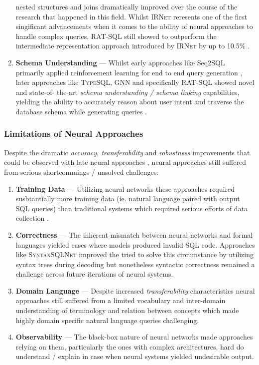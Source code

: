 \documentclass{article}
\begin{document}
\begin{enumerate}
          nested structures and joins dramatically improved over the course of the research that happened in this field. Whilst 
          \textsc{IRNet} reresents one of the first singificant advancements when it comes to the ability of neural approaches to handle
          complex queries, \textsc{RAT-SQL} still showed to outperform the intermediate representation approach introduced by \textsc{IRNet}
          by up to 10.5\% \citep{IRNet, RATSQL}.
    \item \textbf{Schema Understanding} — Whilst early approaches like Seq2SQL primarily applied reinforcement learning for end to end
          query generation \citep{Seq2SQL}, later approaches like \textsc{TypeSQL, GNN} and specifically \textsc{RAT-SQL} showed novel and state-of-
          the-art \textit{schema understanding / schema linking} capabilities, yielding the ability to accurately reason about user intent and
          traverse the database schema while generating queries \citep{TypeSQL, GNN, RATSQL}. 
\end{enumerate}

\subsubsection{Limitations of Neural Approaches}

Despite the dramatic \textit{accuracy, transferability} and \textit{robustness} improvements that could be observed with late neural
approaches \citep{IRNet, RATSQL}, neural approaches still suffered from serious shortcommings / unsolved challenges:

\begin{enumerate}
    \item \textbf{Training Data} — Utilizing neural networks these approaches required susbtantially more training data (ie. natural language
          paired with output SQL queries) than traditional systems which required serious efforts of data collection \citep{Spider}.
    \item \textbf{Correctness} — The inherent mismatch between neural networks and formal languages yielded cases where models produced
          invalid SQL code. Approaches like \textsc{SyntaxSQLNet} improved the tried to solve this circumstance by utilizing syntax trees
          during decoding but nonetheless syntactic correctness remained a challenge across future iterations of neural systems. \citep{SyntaxSQLNet}
    \item \textbf{Domain Language} — Despite increased \textit{transferability} characteristics neural approaches still suffered from a
          limited vocabulary and inter-domain understanding of terminology and relation between concepts which made highly domain
          specific natural language queries challenging.
    \item \textbf{Observability} — The black-box nature of neural networks made approaches relying on them, particularly the ones with complex
          architectures, hard do understand / explain in case when neural systems yielded undesirable output. 
\end{enumerate}
\end{document}

